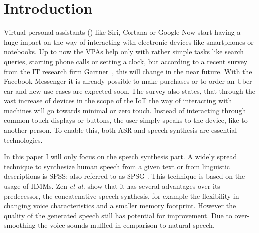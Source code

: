 

\section{Introduction}
\label{sec:introduction}

Virtual personal assistants () like Siri, Cortana or Google Now start having a huge impact on the way of interacting with electronic devices like smartphones or notebooks. Up to now the \acp{VPA} help only with rather simple tasks like search queries, starting phone calls or setting a clock, but according to a recent survey from the IT research firm Gartner~\cite{gartner:assistants}, this will change in the near future. With the Facebook Messenger it is already possible to make purchases or to order an Uber car and new use cases are expected soon. The survey also states, that through the vast increase of devices in the scope of the \ac{IoT} the way of interacting with machines will go towards minimal or zero touch. Instead of interacting through common touch-displays or buttons, the user simply speaks to the device, like to another person. To enable this, both \ac{ASR} and speech synthesis are essential technologies.

In this paper I will only focus on the speech synthesis part. A widely spread technique to synthesize human speech from a given text or from linguistic descriptions is \ac{SPSS}; also referred to as \ac{SPSG} \cite{ling:deep}. This technique is based on the usage of \acp{HMM}. Zen \textsl{et al.} \cite{zen:statistical} show that it has several advantages over its predecessor, the concatenative speech synthesis, for example the flexibility in changing voice characteristics and a smaller memory footprint. However the quality of the generated speech still has potential for improvement. Due to over-smoothing the voice sounds muffled in comparison to natural speech.

